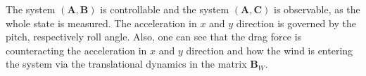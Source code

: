 The system $(\mathbf{A},\mathbf{B})$ is controllable and the system $(\mathbf{A},\mathbf{C})$ is observable, as the whole state is measured. The acceleration in $x$ and $y$ direction is governed by the pitch, respectively roll angle. Also, one can see that the drag force is counteracting the acceleration in $x$ and $y$ direction and how the wind is entering the system via the translational dynamics in the matrix $\mathbf{B}_W$. 

